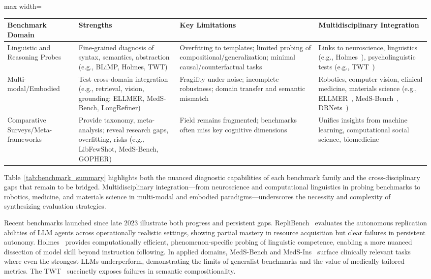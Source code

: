 \documentclass[sigconf]{acmart}
\begin{document}
\begin{table*}[htbp]
  \centering
  \caption{Comparison of Major Benchmark Themes and Identified Limitations}
  \label{tab:benchmark_summary}
  \begin{adjustbox}{max width=\textwidth}
  \begin{tabular}{@{}llll@{}}
    \toprule
    \textbf{Benchmark Domain} & \textbf{Strengths} & \textbf{Key Limitations} & \textbf{Multidisciplinary Integration} \\
    \midrule
    Linguistic and Reasoning Probes & Fine-grained diagnosis of syntax, semantics, abstraction (e.g., BLiMP, Holmes, TWT) & Overfitting to templates; limited probing of compositional/generalization; minimal causal/counterfactual tasks & Links to neuroscience, linguistics (e.g., Holmes~\cite{ref97}), psycholinguistic tests (e.g., TWT~\cite{ref96})\\
    Multi-modal/Embodied & Test cross-domain integration (e.g., retrieval, vision, grounding; ELLMER, MedS-Bench, LongRefiner) & Fragility under noise; incomplete robustness; domain transfer and semantic mismatch & Robotics, computer vision, clinical medicine, materials science (e.g., ELLMER~\cite{ref37}, MedS-Bench~\cite{ref95}, DRNets~\cite{ref89}) \\
    Comparative Surveys/Meta-frameworks & Provide taxonomy, meta-analysis; reveal research gaps, overfitting, risks (e.g., LibFewShot, MedS-Bench, GOPHER) & Field remains fragmented; benchmarks often miss key cognitive dimensions & Unifies insights from machine learning, computational social science, biomedicine \\
    \bottomrule
  \end{tabular}
  \end{adjustbox}
\end{table*}

Table~\ref{tab:benchmark_summary} highlights both the nuanced diagnostic capabilities of each benchmark family and the cross-disciplinary gaps that remain to be bridged. Multidisciplinary integration---from neuroscience and computational linguistics in probing benchmarks to robotics, medicine, and materials science in multi-modal and embodied paradigms---underscores the necessity and complexity of synthesizing evaluation strategies.

Recent benchmarks launched since late 2023 illustrate both progress and persistent gaps. RepliBench~\cite{ref23} evaluates the autonomous replication abilities of LLM agents across operationally realistic settings, showing partial mastery in resource acquisition but clear failures in persistent autonomy. Holmes~\cite{ref97} provides computationally efficient, phenomenon-specific probing of linguistic competence, enabling a more nuanced dissection of model skill beyond instruction following. In applied domains, MedS-Bench and MedS-Ins~\cite{ref95} surface clinically relevant tasks where even the strongest LLMs underperform, demonstrating the limits of generalist benchmarks and the value of medically tailored metrics. The TWT~\cite{ref96} succinctly exposes failures in semantic compositionality.
\end{document}
